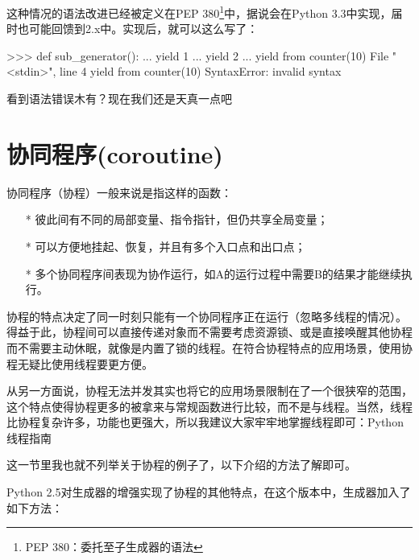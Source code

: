 \documentclass[12pt,a4paper]{report}
\begin{document}
\begin{enumerate}
        这种情况的语法改进已经被定义在PEP 380\footnote{PEP 380：委托至子生成器的语法}中，据说会在Python 3.3中实现，届时也可能回馈到2.x中。实现后，就可以这么写了：
        \begin{python}[moreemph={[4]42},caption={},label=ex1]
>>> def sub_generator():
...   yield 1
...   yield 2
...   yield from counter(10)
  File "<stdin>", line 4
    yield from counter(10) SyntaxError: invalid syntax
        \end{python}

看到语法错误木有？现在我们还是天真一点吧~
\end{enumerate}

\section{协同程序(coroutine)}
协同程序（协程）一般来说是指这样的函数：
\begin{itemize}
    \item[*] 彼此间有不同的局部变量、指令指针，但仍共享全局变量；
    \item[*] 可以方便地挂起、恢复，并且有多个入口点和出口点；
    \item[*] 多个协同程序间表现为协作运行，如A的运行过程中需要B的结果才能继续执行。
\end{itemize}

协程的特点决定了同一时刻只能有一个协同程序正在运行（忽略多线程的情况）。得益于此，协程间可以直接传递对象而不需要考虑资源锁、或是直接唤醒其他协程而不需要主动休眠，就像是内置了锁的线程。在符合协程特点的应用场景，使用协程无疑比使用线程要更方便。

从另一方面说，协程无法并发其实也将它的应用场景限制在了一个很狭窄的范围，这个特点使得协程更多的被拿来与常规函数进行比较，而不是与线程。当然，线程比协程复杂许多，功能也更强大，所以我建议大家牢牢地掌握线程即可：Python线程指南

这一节里我也就不列举关于协程的例子了，以下介绍的方法了解即可。

Python 2.5对生成器的增强实现了协程的其他特点，在这个版本中，生成器加入了如下方法：
\end{document}
